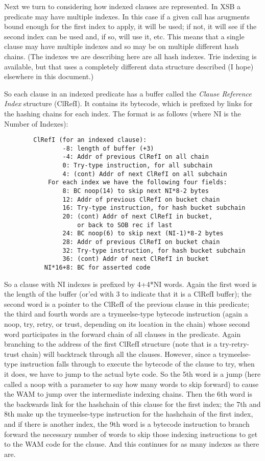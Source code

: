 \documentclass[11pt]{article}
\begin{document}
Next we turn to considering how indexed clauses are represented.  In
XSB a predicate may have multiple indexes.  In this case if a given
call has arugments bound enough for the first index to apply, it will
be used; if not, it will see if the second index can be used and, if
so, will use it, etc.  This means that a single clause may have
multiple indexes and so may be on multiple different hash chains.
(The indexes we are describing here are all hash indexes.  Trie
indexing is available, but that uses a completely different data
structure described (I hope) elsewhere in this document.)

So each clause in an indexed predicate has a buffer called the {\em
Clause Reference Index} structure (ClRefI).  It contains its bytecode,
which is prefixed by links for the hashing chains for each index.  The
format is as follows (where NI is the Number of Indexes):
\begin{verbatim}
        ClRefI (for an indexed clause):
                -8: length of buffer (+3)
                -4: Addr of previous ClRefI on all chain
                0: Try-type instruction, for all subchain
                4: (cont) Addr of next ClRefI on all subchain
            For each index we have the following four fields: 
                8: BC noop(14) to skip next NI*8-2 bytes
                12: Addr of previous ClRefI on bucket chain
                16: Try-type instruction, for hash bucket subchain
                20: (cont) Addr of next ClRefI in bucket,
                    or back to SOB rec if last
                24: BC noop(6) to skip next (NI-1)*8-2 bytes
                28: Addr of previous ClRefI on bucket chain
                32: Try-type instruction, for hash bucket subchain
                36: (cont) Addr of next ClRefI in bucket
           NI*16+8: BC for asserted code
\end{verbatim}

So a clause with NI indexes is prefixed by 4+4*NI words.  Again the
first word is the length of the buffer (or'ed with 3 to indicate that
it is a ClRefI buffer); the second word is a pointer to the ClRefI of
the previous clause in this predicate; the third and fourth words are
a trymeelse-type bytecode instruction (again a noop, try, retry, or
trust, depending on its location in the chain) whose second word
participates in the forward chain of all clauses in the predicate.
Again branching to the address of the first ClRefI structure (note
that is a try-retry-trust chain) will backtrack through all the
clauses.  However, since a trymeelse-type instruction falls through to
execute the bytecode of the clause to try, when it does, we have to
jump to the actual byte code.  So the 5th word is a jump (here called
a noop with a parameter to say how many words to skip forward) to
cause the WAM to jump over the intermediate indexing chains.  Then the
6th word is the backwards link for the hashchain of this clause for
the first index; the 7th and 8th make up the trymeelse-type
instruction for the hashchain of the first index, and if there is
another index, the 9th word is a bytecode instruction to branch
forward the necessary number of words to skip those indexing
instructions to get to the WAM code for the clause.  And this
continues for as many indexes as there are.
\end{document}
